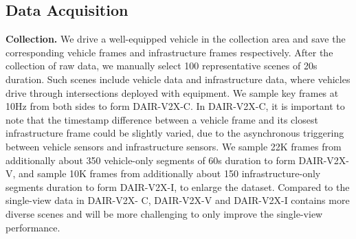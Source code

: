 \subsection{Data Acquisition}\label{sec:DataAcquisition}
\noindent \textbf{Collection.}
We drive a well-equipped vehicle in the collection area and save the corresponding vehicle frames and infrastructure frames respectively.
After the collection of raw data, we manually select 100 representative scenes of 20s duration.
Such scenes include vehicle data and infrastructure data, where vehicles drive through intersections deployed with equipment.
We sample key frames at 10Hz from both sides to form DAIR-V2X-C.
In DAIR-V2X-C, it is important to note that the timestamp difference between a vehicle frame and its closest infrastructure frame could be slightly varied, due to the asynchronous triggering between vehicle sensors and infrastructure sensors. 
We sample 22K frames from additionally about 350 vehicle-only segments of 60s duration to form DAIR-V2X-V, and sample 10K frames from additionally about 150 infrastructure-only segments duration to form DAIR-V2X-I, to enlarge the dataset.
Compared to the single-view data in DAIR-V2X-
C, DAIR-V2X-V and DAIR-V2X-I contains more diverse scenes and will be more challenging to only improve the single-view performance.

